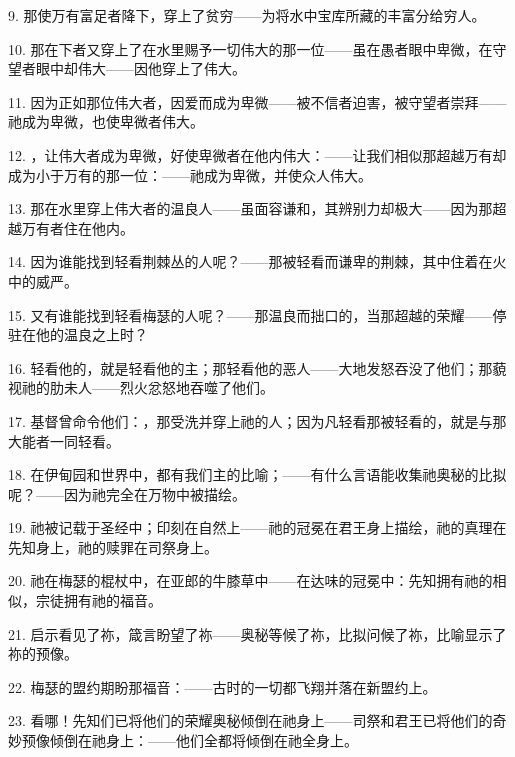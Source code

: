 9. 那使万有富足者降下，穿上了贫穷——为将水中宝库所藏的丰富分给穷人。\par

10. 那在下者又穿上了在水里赐予一切伟大的那一位——虽在愚者眼中卑微，在守望者眼中却伟大——因他穿上了伟大。\par

11. 因为正如那位伟大者，因爱而成为卑微——被不信者迫害，被守望者崇拜——祂成为卑微，也使卑微者伟大。\par

12. ，让伟大者成为卑微，好使卑微者在他内伟大：——让我们相似那超越万有却成为小于万有的那一位：——祂成为卑微，并使众人伟大。\par

13. 那在水里穿上伟大者的温良人——虽面容谦和，其辨别力却极大——因为那超越万有者住在他内。\par

14. 因为谁能找到轻看荆棘丛的人呢？——那被轻看而谦卑的荆棘，其中住着在火中的威严。\par

15. 又有谁能找到轻看梅瑟的人呢？——那温良而拙口的，当那超越的荣耀——停驻在他的温良之上时？\par

16. 轻看他的，就是轻看他的主；那轻看他的恶人——大地发怒吞没了他们；那藐视祂的肋未人——烈火忿怒地吞噬了他们。\par

17. 基督曾命令他们：，那受洗并穿上祂的人；因为凡轻看那被轻看的，就是与那大能者一同轻看。\par

18. 在伊甸园和世界中，都有我们主的比喻；——有什么言语能收集祂奥秘的比拟呢？——因为祂完全在万物中被描绘。\par

19. 祂被记载于圣经中；印刻在自然上——祂的冠冕在君王身上描绘，祂的真理在先知身上，祂的赎罪在司祭身上。\par

20. 祂在梅瑟的棍杖中，在亚郎的牛膝草中——在达味的冠冕中：先知拥有祂的相似，宗徒拥有祂的福音。\par

21. 启示看见了祢，箴言盼望了祢——奥秘等候了祢，比拟问候了祢，比喻显示了祢的预像。\par

22. 梅瑟的盟约期盼那福音：——古时的一切都飞翔并落在新盟约上。\par

23. 看哪！先知们已将他们的荣耀奥秘倾倒在祂身上——司祭和君王已将他们的奇妙预像倾倒在祂身上：——他们全都将倾倒在祂全身上。\par


